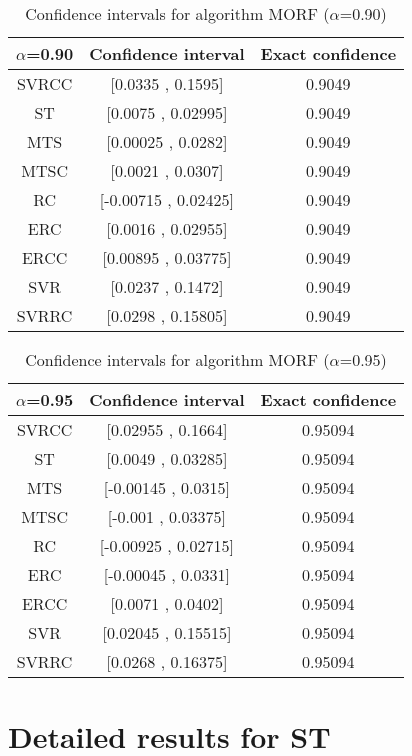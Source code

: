 \documentclass[a4paper,10pt]{article}
\begin{document}
\begin{table}[!htp]
\centering\small
\begin{tabular}{
|c|c|c|}
\hline
 $\alpha$=0.90 & Confidence interval & Exact confidence \\ \hline 
SVRCC & [0.0335 , 0.1595] & 0.9049\\ \hline 
ST & [0.0075 , 0.02995] & 0.9049\\ \hline 
MTS & [0.00025 , 0.0282] & 0.9049\\ \hline 
MTSC & [0.0021 , 0.0307] & 0.9049\\ \hline 
RC & [-0.00715 , 0.02425] & 0.9049\\ \hline 
ERC & [0.0016 , 0.02955] & 0.9049\\ \hline 
ERCC & [0.00895 , 0.03775] & 0.9049\\ \hline 
SVR & [0.0237 , 0.1472] & 0.9049\\ \hline 
SVRRC & [0.0298 , 0.15805] & 0.9049\\ \hline 

\end{tabular}
\caption{Confidence intervals for algorithm MORF ($\alpha$=0.90)}
\end{table}
\begin{table}[!htp]
\centering\small
\begin{tabular}{
|c|c|c|}
\hline
 $\alpha$=0.95 & Confidence interval & Exact confidence \\ \hline 
SVRCC & [0.02955 , 0.1664] & 0.95094\\ \hline 
ST & [0.0049 , 0.03285] & 0.95094\\ \hline 
MTS & [-0.00145 , 0.0315] & 0.95094\\ \hline 
MTSC & [-0.001 , 0.03375] & 0.95094\\ \hline 
RC & [-0.00925 , 0.02715] & 0.95094\\ \hline 
ERC & [-0.00045 , 0.0331] & 0.95094\\ \hline 
ERCC & [0.0071 , 0.0402] & 0.95094\\ \hline 
SVR & [0.02045 , 0.15515] & 0.95094\\ \hline 
SVRRC & [0.0268 , 0.16375] & 0.95094\\ \hline 

\end{tabular}
\caption{Confidence intervals for algorithm MORF ($\alpha$=0.95)}
\end{table}

 \clearpage 


\section{Detailed results for ST}
\end{document}
